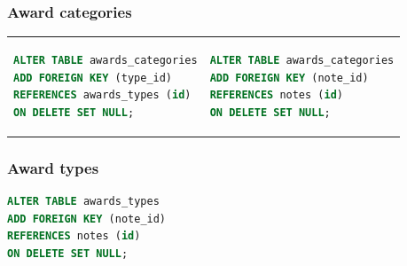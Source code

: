 \documentclass[doubleside, titlepage]{article}
\begin{document}
\subsubsection{Award categories}

\begin{tabular}{ ll }
\begin{minipage}{3in}
\begin{lstlisting}[language=SQL,showspaces=false,basicstyle=\ttfamily,numberstyle=\tiny,commentstyle=\color{gray}
        ]
ALTER TABLE awards_categories
ADD FOREIGN KEY (type_id)
REFERENCES awards_types (id)
ON DELETE SET NULL;
\end{lstlisting}
\end{minipage}
 &
\begin{minipage}{3in}
\begin{lstlisting}[language=SQL,showspaces=false,basicstyle=\ttfamily,numberstyle=\tiny,commentstyle=\color{gray}
        ]
ALTER TABLE awards_categories
ADD FOREIGN KEY (note_id)
REFERENCES notes (id)
ON DELETE SET NULL;
\end{lstlisting}
\end{minipage}
\end{tabular}

\subsubsection{Award types}
\begin{lstlisting}[language=SQL,showspaces=false,basicstyle=\ttfamily,numberstyle=\tiny,commentstyle=\color{gray}
        ]
ALTER TABLE awards_types
ADD FOREIGN KEY (note_id)
REFERENCES notes (id)
ON DELETE SET NULL;
\end{lstlisting}
\end{document}
